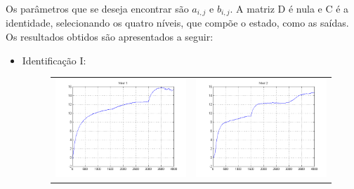 Os parâmetros que se deseja encontrar são $a_{i,j}$ e $b_{i,j}$. A matriz D é nula e C é a identidade, selecionando os quatro níveis, que compõe o estado, como as saídas. Os resultados obtidos são apresentados a seguir:

\begin{itemize}
\newpage \item  Identificação I:

\begin{figure}[H]
	\centering
	\begin{tabular}{cc}
		\includegraphics[height=0.15\paperheight,keepaspectratio]{img/sim1_h1.png} &
		\includegraphics[height=0.15\paperheight,keepaspectratio]{img/sim1_h2.png} \\

\end{tabular}
\end{figure}
\end{itemize}

